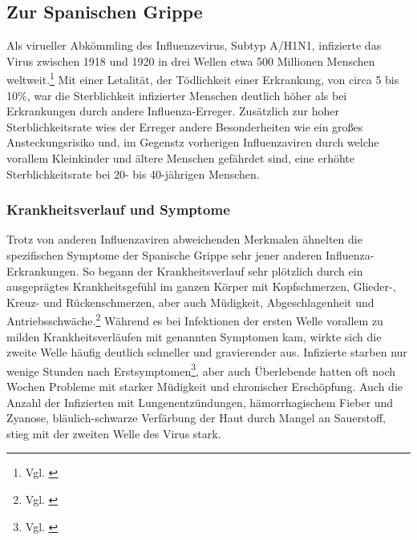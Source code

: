 \documentclass[12pt]{article}
\begin{document}
\subsection{Zur Spanischen Grippe}
Als virueller Abkömmling des Influenzevirus, Subtyp A/H1N1, infizierte das Virus zwischen 1918 und 1920 in drei Wellen etwa 500 Millionen Menschen weltweit.\footnote{Vgl. \cite{Span}} Mit einer Letalität, der Tödlichkeit einer Erkrankung, von circa 5 bis 10\%, war die Sterblichkeit infizierter Menschen deutlich höher als bei Erkrankungen durch andere Influenza-Erreger. Zusätzlich zur hoher Sterblichkeitsrate wies der Erreger andere Besonderheiten wie ein großes Ansteckungsrisiko und, im Gegenstz vorherigen Influenzaviren durch welche vorallem Kleinkinder und ältere Menschen gefährdet sind, eine erhöhte Sterblichkeitsrate bei 20- bis 40-jährigen Menschen. 

\subsubsection{Krankheitsverlauf und Symptome}
Trotz von anderen Influenzaviren abweichenden Merkmalen ähnelten die spezifischen Symptome der Spanische Grippe sehr jener anderen Influenza-Erkrankungen. So begann der Krankheitsverlauf sehr plötzlich durch ein ausgeprägtes Krankheitsgefühl im ganzen Körper mit Kopfschmerzen, Glieder-, Kreuz- und Rückenschmerzen, aber auch Müdigkeit, Abgeschlagenheit und Antriebsschwäche.\footnote{Vgl. \cite{Span}} Während es bei Infektionen der ersten Welle vorallem zu milden Krankheitsverläufen mit genannten Symptomen kam, wirkte sich die zweite Welle häufig deutlich schneller und gravierender aus. Infizierte starben nur wenige Stunden nach Erstsymptomen\footnote{Vgl. \cite{Hanan2021}}, aber auch Überlebende hatten oft noch Wochen Probleme mit starker Müdigkeit und chronischer Erschöpfung. Auch die Anzahl der Infizierten mit Lungenentzündungen, hämorrhagischem Fieber und Zyanose, bläulich-schwarze Verfärbung der Haut durch Mangel an Sauerstoff, stieg mit der zweiten Welle des Virus stark. 
\end{document}
